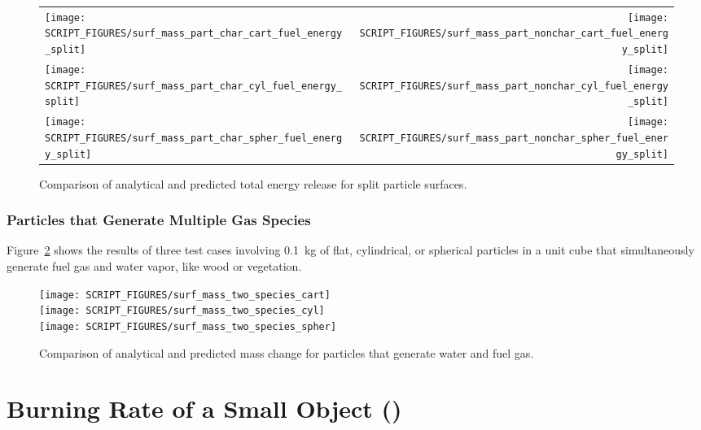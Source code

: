 \documentclass[11pt]{book}
\begin{document}
\begin{figure}[p]
\begin{tabular*}{\textwidth}{l@{\extracolsep{\fill}}r}
\texttt{[image: SCRIPT\_FIGURES/surf\_mass\_part\_char\_cart\_fuel\_energy\_split]} &
\texttt{[image: SCRIPT\_FIGURES/surf\_mass\_part\_nonchar\_cart\_fuel\_energy\_split]} \\
\texttt{[image: SCRIPT\_FIGURES/surf\_mass\_part\_char\_cyl\_fuel\_energy\_split]} &
\texttt{[image: SCRIPT\_FIGURES/surf\_mass\_part\_nonchar\_cyl\_fuel\_energy\_split]} \\
\texttt{[image: SCRIPT\_FIGURES/surf\_mass\_part\_char\_spher\_fuel\_energy\_split]} &
\texttt{[image: SCRIPT\_FIGURES/surf\_mass\_part\_nonchar\_spher\_fuel\_energy\_split]}
\end{tabular*}
\caption[The  test cases, energy conservation]{Comparison of analytical and predicted total energy release for split particle surfaces.}
\label{surf_mass_part_fuel_energy_split}
\end{figure}


\subsubsection{Particles that Generate Multiple Gas Species}
\label{surf_mass_two_species_cart}
\label{surf_mass_two_species_cyl}
\label{surf_mass_two_species_spher}

Figure~\ref{surf_mass_two_species} shows the results of three test cases involving 0.1~kg of flat, cylindrical, or spherical particles in a unit cube that simultaneously generate fuel gas and water vapor, like wood or vegetation.

\begin{figure}[!htb]
\centering
\texttt{[image: SCRIPT\_FIGURES/surf\_mass\_two\_species\_cart]} \\
\texttt{[image: SCRIPT\_FIGURES/surf\_mass\_two\_species\_cyl]} \\
\texttt{[image: SCRIPT\_FIGURES/surf\_mass\_two\_species\_spher]}
\caption[The  test cases]{Comparison of analytical and predicted mass change for particles that generate water and fuel gas.}
\label{surf_mass_two_species}
\end{figure}





\section{Burning Rate of a Small Object (\texorpdfstring{}{cell\_burn\_away})}
\label{cell_burn_away}
\end{document}
